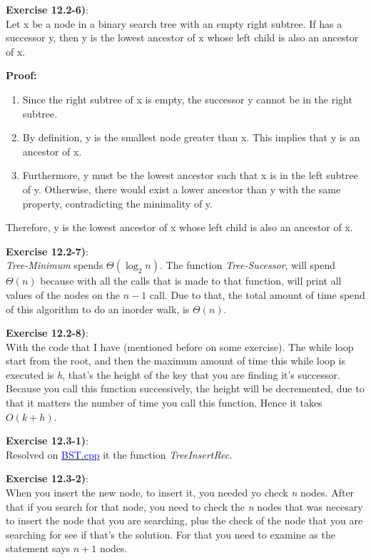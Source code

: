 \documentclass{article}
\newcounter{exercise}[section]   %
\begin{document}
\textbf{Exercise 12.2-6)}:\\
Let x be a node in a binary search tree  with an empty right subtree. If has a successor
y, then y is the lowest ancestor of x whose left child is also an ancestor of x.

\textbf{Proof:}
\begin{enumerate}
\item Since the right subtree of x is empty, the successor y cannot be in the right subtree.
\item By definition, y is the smallest node greater than x. This implies that y is an 
ancestor of x.
\item Furthermore, 
y must be the lowest ancestor such that x is in the left subtree of y. Otherwise, there 
would exist a lower ancestor than y with the same property, contradicting the minimality of
y.
\end{enumerate}
Therefore, y is the lowest ancestor of x whose left child is also an ancestor of x.

\textbf{Exercise 12.2-7)}:\\
\textit{Tree-Minimum} spends \(\Theta(\log_2 n)\). The function \textit{Tree-Sucessor}, will
spend \(\Theta(n)\) because with all the calls that is made to that function, will print all
values of the nodes on the \(n - 1\) call. Due to that, the total amount of time spend of
this algorithm to do an inorder walk, is \(\Theta(n)\).

\textbf{Exercise 12.2-8)}:\\
With the code that I have (mentioned before on some exercise). The while loop start from the
root, and then the maximum amount of time this while loop is executed is \textit{h}, that's 
the height of the key that you are finding it's successor. Because you call this function
successively, the height will be decremented, due to that it matters the number of time
you call this function. Hence it takes \(O(k + h)\).

\textbf{Exercise 12.3-1)}:\\
Resolved on \href{https://github.com/Graburr/Algorithms_CLRS_4ed_solutions/tree/main/chapter3/Binary_Search_Trees/BST.cpp}
{\textcolor{Blue}{BST.cpp}} it the function \textit{TreeInsertRec}.

\textbf{Exercise 12.3-2)}:\\
When you insert the new node, to insert it, you needed yo check \textit{n} nodes. After that
if you search for that node, you need to check the \textit{n} nodes that was necesary to insert
the node that you are searching, plus the check of the node that you are searching for see
if that's the solution. For that you need to examine as the statement says \(n + 1\) nodes.
\end{document}
